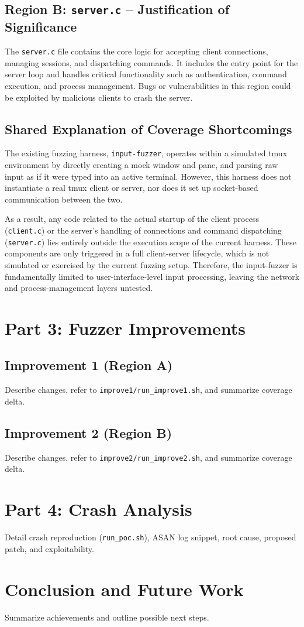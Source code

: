 \documentclass[11pt,a4paper,twocolumn]{article}
\begin{document}
\subsection{Region B: \texttt{server.c} – Justification of Significance}
The \texttt{server.c} file contains the core logic for accepting client connections, managing sessions, and dispatching commands. It includes the entry point for the server loop and handles critical functionality such as authentication, command execution, and process management. Bugs or vulnerabilities in this region could be exploited by malicious clients to crash the server.

\subsection*{Shared Explanation of Coverage Shortcomings}
The existing fuzzing harness, \texttt{input-fuzzer}, operates within a simulated tmux environment by directly creating a mock window and pane, and parsing raw input as if it were typed into an active terminal. However, this harness does not instantiate a real tmux client or server, nor does it set up socket-based communication between the two.

As a result, any code related to the actual startup of the client process (\texttt{client.c}) or the server's handling of connections and command dispatching (\texttt{server.c}) lies entirely outside the execution scope of the current harness. These components are only triggered in a full client-server lifecycle, which is not simulated or exercised by the current fuzzing setup. Therefore, the input-fuzzer is fundamentally limited to user-interface-level input processing, leaving the network and process-management layers untested.

\section{Part 3: Fuzzer Improvements}

\subsection{Improvement 1 (Region A)}
Describe changes, refer to \texttt{improve1/run\_improve1.sh}, and summarize coverage delta.

\subsection{Improvement 2 (Region B)}
Describe changes, refer to \texttt{improve2/run\_improve2.sh}, and summarize coverage delta.

\section{Part 4: Crash Analysis}
Detail crash reproduction (\texttt{run\_poc.sh}), ASAN log snippet, root cause, proposed patch, and exploitability.

\section{Conclusion and Future Work}
Summarize achievements and outline possible next steps.

\printbibliography
\end{document}
